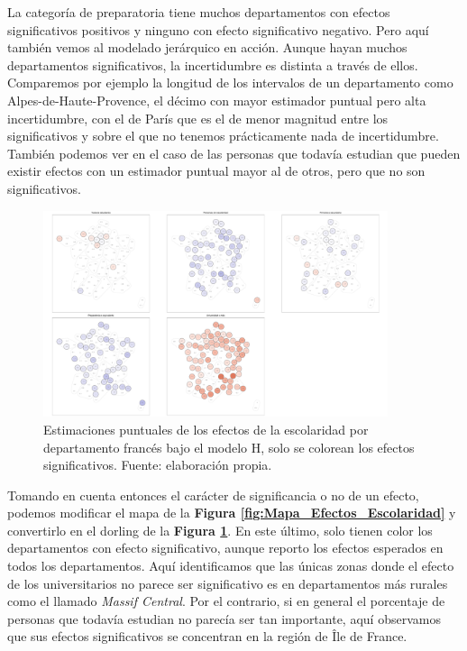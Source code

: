 La categoría de preparatoria tiene muchos departamentos con efectos significativos positivos y ninguno con efecto significativo negativo. Pero aquí también vemos al modelado jerárquico en acción. Aunque hayan muchos departamentos significativos, la incertidumbre es distinta a través de ellos. Comparemos por ejemplo la longitud de los intervalos de un departamento como Alpes-de-Haute-Provence, el décimo con mayor estimador puntual pero alta incertidumbre, con el de París que es el de menor magnitud entre los significativos y sobre el que no tenemos prácticamente nada de incertidumbre. También podemos ver en el caso de las personas que todavía estudian que pueden existir efectos con un estimador puntual mayor al de otros, pero que no son significativos.\\

\begin{figure}[h]
	\centering
	\includegraphics[width = 0.9\textwidth]{Figs/Efectos/Dorling_Efectos_Escolaridad_Modelo_H}
	\caption{Estimaciones puntuales de los efectos de la escolaridad por departamento francés bajo el modelo H, solo se colorean los efectos significativos. Fuente: elaboración propia.}
	\label{fig:Dorling_Efectos_Escolaridad}
\end{figure}

Tomando en cuenta entonces el carácter de significancia o no de un efecto, podemos modificar el mapa de la \textbf{Figura \ref{fig:Mapa_Efectos_Escolaridad}} y convertirlo en el dorling de la \textbf{Figura \ref{fig:Dorling_Efectos_Escolaridad}}. En este último, solo tienen color los departamentos con efecto significativo, aunque reporto los efectos esperados en todos los departamentos. Aquí identificamos que las únicas zonas donde el efecto de los universitarios no parece ser significativo es en departamentos más rurales como el llamado \textit{Massif Central}. Por el contrario, si en general el porcentaje de personas que todavía estudian no parecía ser tan importante, aquí observamos que sus efectos significativos se concentran en la región de Île de France. 

